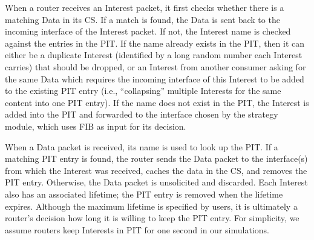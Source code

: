 When a router receives an Interest packet, it first checks whether there is a matching Data in its CS.
If a match is found, the Data is sent back to the incoming interface of the Interest packet.
If not, the Interest name is checked against the entries in the PIT. 
If the name already exists in the PIT, then it can either be a duplicate Interest (identified by a long random number each Interest carries) that should be dropped,
or an Interest from another consumer asking for the same Data which requires the incoming interface of this Interest to be added to the existing PIT entry (i.e., ``collapsing'' multiple Interests for the same content into one PIT entry).
If the name does not exist in the PIT, the Interest is added into the PIT and forwarded to the interface chosen by the strategy module, which uses FIB as input for its decision.

When a Data packet is received, its name is used to look up the PIT.
If a matching PIT entry is found,
the router sends the Data packet to the interface(s) from which the Interest was received, caches the data in the CS, and removes the PIT entry.  Otherwise, the Data packet is unsolicited and discarded. 
Each Interest also has an associated lifetime; the PIT entry is removed when the lifetime expires.
Although the maximum lifetime is specified by users, it is ultimately a router's decision how long it is willing to keep the PIT entry.  
For simplicity, we assume routers keep Interests in PIT for one second in our simulations.






